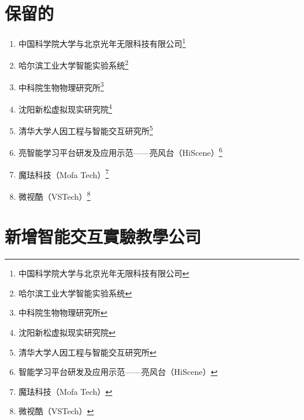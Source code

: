 \documentclass[UTF8,charset=none,a4paper,twoside]{ctexart}
\begin{document}
\tableofcontents

\newpage

\section{保留的}

\begin{enumerate}
    \item 中国科学院大学与北京光年无限科技有限公司\footnote{中国科学院大学与北京光年无限科技有限公司}
    \item 哈尔滨工业大学智能实验系统\footnote{哈尔滨工业大学智能实验系统}
    \item 中科院生物物理研究所\footnote{中科院生物物理研究所}
    \item 沈阳新松虚拟现实研究院\footnote{沈阳新松虚拟现实研究院}
    \item 清华大学人因工程与智能交互研究所\footnote{清华大学人因工程与智能交互研究所}
    \item 亮智能学习平台研发及应用示范——亮风台（HiScene）\footnote{智能学习平台研发及应用示范——亮风台（HiScene）}
    \item 魔珐科技（Mofa Tech）\footnote{魔珐科技（Mofa Tech）}
    \item 微视酷（VSTech）\footnote{微视酷（VSTech）}
\end{enumerate}

\section{新增智能交互實驗教學公司}
\end{document}
